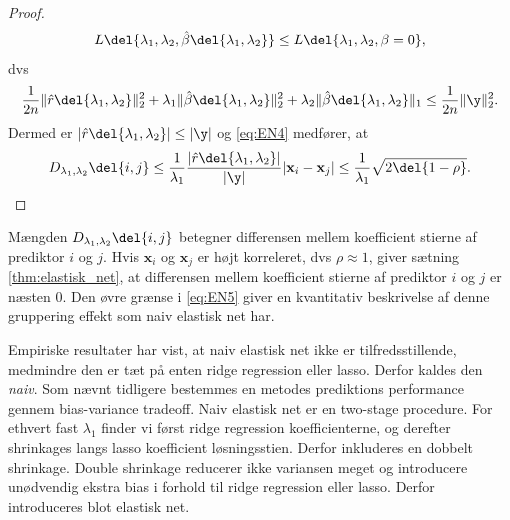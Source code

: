 \begin{proof}
\begin{align*}
L \del{\lambda_1,\lambda_2, \hat{\beta}\del{\lambda_1, \lambda_2}} \leq L \del{\lambda_1,\lambda_2, \beta = 0},  
\end{align*}
dvs
\begin{align*}
\frac{1}{2n} \Vert \hat{r} \del{\lambda_1, \lambda_2} \Vert_2^2 + \lambda_1 \Vert \hat{\beta} \del{\lambda_1, \lambda_2} \Vert_2^2 + \lambda_2 \Vert \hat{\beta} \del{\lambda_1, \lambda_2} \Vert_1 \leq \frac{1}{2n} \Vert \y \Vert_2^2.  
\end{align*}
Dermed er \(\vert \hat{r} \del{\lambda_1, \lambda_2} \vert \leq \vert \y \vert\) og \eqref{eq:EN4} medfører, at
\begin{align*}
D_{\lambda_1, \lambda_2} \del{i,j} \leq \frac{1}{\lambda_1} \frac{\vert \hat{r} \del{\lambda_1, \lambda_2} \vert}{\vert \y \vert} \vert \mathbf{x}_i - \mathbf{x}_j \vert  \leq \frac{1}{\lambda_1} \sqrt{2 \del{1-\rho}}.
\end{align*}
\end{proof}
Mængden \(D_{\lambda_1, \lambda_2} \del{i,j}\) betegner differensen mellem koefficient stierne af prediktor \(i\) og \(j\).
Hvis \(\mathbf{x}_i\) og \(\mathbf{x}_j\) er højt korreleret, dvs \(\rho \approx 1\), giver sætning \ref{thm:elastisk_net}, at differensen mellem koefficient stierne af prediktor \(i\) og \(j\) er næsten 0.
Den øvre grænse i \eqref{eq:EN5} giver en kvantitativ beskrivelse af denne gruppering effekt som naiv elastisk net har.

Empiriske resultater har vist, at naiv elastisk net ikke er tilfredsstillende, medmindre den er tæt på enten ridge regression eller lasso.
Derfor kaldes den \textit{naiv}.
Som nævnt tidligere bestemmes en metodes prediktions performance gennem bias-variance tradeoff. 
Naiv elastisk net er en two-stage procedure. For ethvert fast \(\lambda_1\) finder vi først ridge regression koefficienterne, og derefter shrinkages langs lasso koefficient løsningsstien. Derfor inkluderes en dobbelt shrinkage.
Double shrinkage reducerer ikke variansen meget og introducere unødvendig ekstra bias i forhold til ridge regression eller lasso.
Derfor introduceres blot elastisk net.

